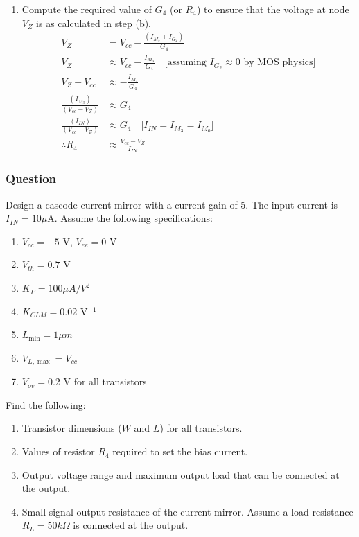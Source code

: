 \begin{enumerate}
    from step (a).
  \item Compute the required value of $G_4$ (or
    $R_4$) to ensure that the voltage at node
    $V_{Z}$ is as calculated in step (b).
    \begin{align*}
      V_{Z} &= V_{cc} - \frac{(I_{M_3} + I_{G_2})}{G_4} \\
      V_{Z} &\approx V_{cc} - \frac{I_{M_3}}{G_4} \quad \text{[assuming } I_{G_2} \approx 0 \text{ by MOS physics]} \\
      V_{Z} - V_{cc} &\approx - \frac{I_{M_3}}{G_4} \\
      \frac{(I_{M_3})}{(V_{cc} - V_{Z})} &\approx G_4 \\
      \frac{(I_{IN})}{(V_{cc} - V_{Z})} &\approx G_4 \quad \text{[} I_{IN} = I_{M_3} = I_{M_0} \text{]} \\
      \therefore R_4 &\approx \frac{V_{cc} - V_{Z}}{I_{IN}}
    \end{align*}
\end{enumerate}

\subsubsection{Question}
Design a cascode current mirror with a current
gain of 5. The input current is $I_{IN} = 10 \mu$A.
Assume the following specifications:
\begin{enumerate}
  \item $V_{cc} = +5$ V, $V_{ee} = 0$ V
  \item $V_{th} = 0.7$ V
  \item $K_P = 100 \mu A/V^2$
  \item $K_{CLM} = 0.02$ V$^{-1}$
  \item $L_{\min} = 1 \mu m$
  \item $V_{L, \max} = V_{cc}$
  \item $V_{ov} = 0.2$ V for all transistors
\end{enumerate}
Find the following:
\begin{enumerate}
  \item Transistor dimensions ($W$ and $L$) for all
    transistors.
  \item Values of resistor $R_4$ required to set
    the bias current.
  \item Output voltage range and maximum output
    load that can be connected at the output.
  \item Small signal output resistance of the
    current mirror. Assume a load resistance
    $R_L = 50 k\Omega$ is connected at the
    output.
\end{enumerate}
